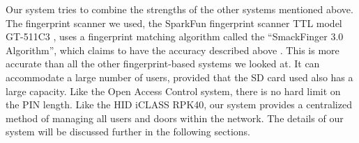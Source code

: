 \noindent Our system tries to combine the strengths of the other systems mentioned above. The fingerprint scanner we used, the SparkFun fingerprint scanner TTL model GT-511C3 \cite{SparkfunFingerprint}, uses a fingerprint matching algorithm called the ``SmackFinger 3.0 Algorithm'', which claims to have the accuracy described above \cite{SmackFingerSDK}. This is more accurate than all the other fingerprint-based systems we looked at. It can accommodate a large number of users, provided that the SD card used also has a large capacity. Like the Open Access Control system, there is no hard limit on the PIN length. Like the HID iCLASS RPK40, our system provides a centralized method of managing all users and doors within the network. The details of our system will be discussed further in the following sections.